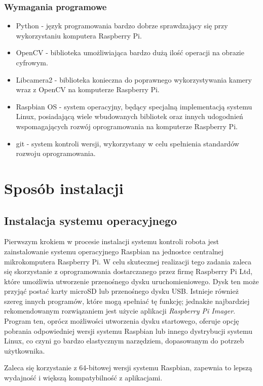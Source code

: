 \subsubsection*{Wymagania programowe}
\begin{itemize}
    \item Python - język programowania bardzo dobrze sprawdzający się przy wykorzystaniu komputera Raspberry Pi.
    \item OpenCV - biblioteka umożliwiająca bardzo dużą ilość operacji na obrazie cyfrowym.
    \item Libcamera2 - biblioteka konieczna do poprawnego wykorzystywania kamery wraz z OpenCV na komputerze Raspberry Pi.
    \item Raspbian OS - system operacyjny, będący specjalną implementacją systemu Linux, posiadającą wiele wbudowanych bibliotek oraz innych udogodnień wspomagających rozwój oprogramowania na komputerze Raspberry Pi. 
    \item git - system kontroli wersji, wykorzystany w celu spełnienia standardów rozwoju oprogramowania.
\end{itemize}

\section{Sposób instalacji}

\subsection{Instalacja systemu operacyjnego}

Pierwszym krokiem w procesie instalacji systemu kontroli robota jest zainstalowanie systemu operacyjnego Raspbian na jednostce centralnej mikrokomputera Raspberry Pi. W celu skutecznej realizacji tego zadania zaleca się skorzystanie z oprogramowania dostarczanego przez firmę Raspberry Pi Ltd, które umożliwia utworzenie przenośnego dysku uruchomieniowego. Dysk ten może przyjąć postać karty microSD lub przenośnego dysku USB. Istnieje również szereg innych programów, które mogą spełniać tę funkcję; jednakże najbardziej rekomendowanym rozwiązaniem jest użycie aplikacji \textit{Raspberry Pi Imager}. Program ten, oprócz możliwości utworzenia dysku startowego, oferuje opcję pobrania odpowiedniej wersji systemu Raspbian lub innego dystrybucji systemu Linux, co czyni go bardzo elastycznym narzędziem, dopasowanym do potrzeb użytkownika.

Zaleca się korzystanie z 64-bitowej wersji systemu Raspbian, zapewnia to lepszą wydajność i większą kompatybilność z aplikacjami.

